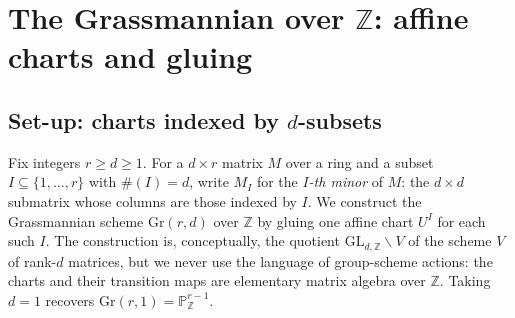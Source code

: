 \chapter{The Grassmannian over $\mathbb{Z}$: affine charts and gluing}
\label{chap:Picard_GrassmannianCells}

\section{Set-up: charts indexed by $d$-subsets}
\label{sec:gr_setup}

Fix integers \(r \ge d \ge 1\). For a \(d \times r\) matrix \(M\) over a ring
and a subset \(I \subseteq \{1, \dots, r\}\) with \(\#(I) = d\), write \(M_I\)
for the \emph{\(I\)-th minor} of \(M\): the \(d \times d\) submatrix whose
columns are those indexed by \(I\). We construct the Grassmannian scheme
\(\mathrm{Gr}(r,d)\) over \(\mathbb{Z}\) by gluing one affine chart \(U^I\) for
each such \(I\). The construction is, conceptually, the quotient
\(\mathrm{GL}_{d,\mathbb{Z}} \backslash V\) of the scheme \(V\) of rank-\(d\)
matrices, but we never use the language of group-scheme actions: the charts and
their transition maps are elementary matrix algebra over \(\mathbb{Z}\). Taking
\(d = 1\) recovers \(\mathrm{Gr}(r,1) = \mathbb{P}^{r-1}_{\mathbb{Z}}\).

